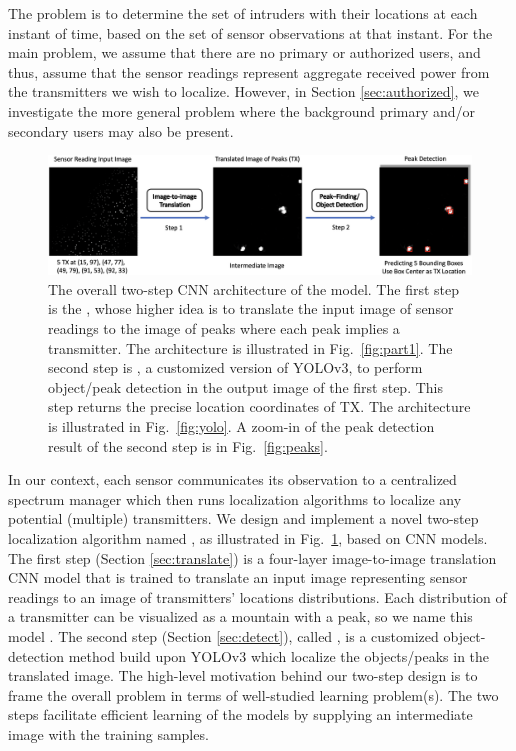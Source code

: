 The \mtl problem is to determine the set of intruders with their
locations at each instant of time, based on the set of sensor
observations at that instant. 
For the main 
\mtl problem, we assume that there are no primary or authorized users, and thus, assume that the
sensor readings represent aggregate received power from the transmitters we
wish to localize.
However, in Section \ref{sec:authorized}, we investigate the more general \mtl problem where the background primary and/or secondary users may also be present.

\begin{figure}
    \centering
    \includegraphics[width=\textwidth]{chapters/wowmom-pmc/figures/two-step-idea.png}
    \vspace{-0.1in}
    \caption{The overall two-step CNN architecture of the \our model. The first step is the \imgimg, whose higher idea is to translate the input image of sensor readings to the image of peaks where each peak implies a transmitter. The \imgimg architecture is illustrated in Fig.~\ref{fig:part1}. The second step is \yolocust, a customized version of YOLOv3, to perform object/peak detection in the output image of the first step. This step returns the precise location coordinates of TX. The \yolocust architecture is illustrated in Fig.~\ref{fig:yolo}. A zoom-in of the peak detection result of the second step is in Fig.~\ref{fig:peaks}.}
    \label{fig:overall}
\end{figure}

In our context, each sensor communicates its observation to a centralized spectrum 
manager which then runs localization algorithms to localize any potential (multiple) transmitters. 
We design and implement a novel two-step localization algorithm named \our, as illustrated in Fig.~\ref{fig:overall}, based on CNN models. 
The first step (Section \ref{sec:translate}) is a four-layer image-to-image translation CNN model that is trained
to translate an input image representing sensor readings to an image of 
transmitters' locations distributions. Each distribution of a transmitter can be visualized as a mountain with a peak, so we name this model \imgimg.
The second step (Section \ref{sec:detect}), called \yolocust, is a customized object-detection method build upon YOLOv3\cite{yolov3} which localize the objects/peaks in the translated image.
The high-level motivation behind our two-step design is to frame the overall \mtl
problem in terms of well-studied learning problem(s). 
The two steps facilitate efficient learning of the models by supplying an intermediate image with the training samples. 
